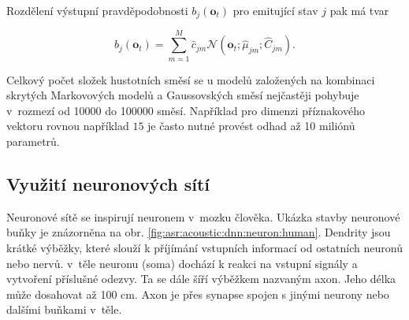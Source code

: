 


\noindent Rozdělení výstupní pravděpodobnosti $b_j\left(\boldsymbol{o}_t\right)$ pro emitující stav $j$ pak má tvar

\begin{equation}
   b_{j}\left(\boldsymbol{o}_t\right) = \sum_{m=1}^{M} \hat{c}_{jm} \mathcal{N}\left(\boldsymbol{o}_t; \hat{\mu}_{jm}; \hat{C}_{jm}\right).
   \label{eq:asr:acoustic:gmm:output}
 \end{equation}

\noindent Celkový počet složek hustotních směsí se u modelů založených na kombinaci skrytých Markovových modelů a Gaussovských směsí nejčastěji pohybuje v~rozmezí od 10000 do 100000 směsí. Například pro dimenzi příznakového vektoru rovnou například $15$ je často nutné provést odhad až 10 miliónů parametrů.

\subsection{Využití neuronových sítí}
\label{chap:asr:acoustic:DNN}

Neuronové sítě se inspirují neuronem v~mozku člověka. Ukázka stavby neuronové buňky je znázorněna na obr. \ref{fig:asr:acoustic:dnn:neuron:human}. Dendrity jsou krátké výběžky, které slouží k příjímání vstupních informací od ostatních neuronů nebo nervů. v~těle neuronu (soma) dochází k reakci na vstupní signály a vytvoření příslušné odezvy. Ta se dále šíří výběžkem nazvaným axon. Jeho délka může dosahovat až 100 cm. Axon je přes synapse spojen s jinými neurony nebo dalšími buňkami v~těle.

